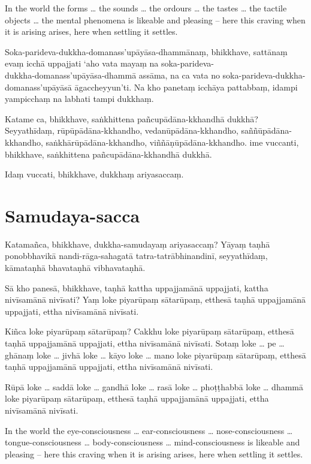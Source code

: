 In the world the forms \ldots{} the sounds \ldots{} the ordours \ldots{} the
tastes \ldots{} the tactile objects \ldots{} the mental phenomena is likeable
and pleasing -- here this craving when it is arising arises, here when settling
it settles.

\paliPage

Soka-parideva-dukkha-domanass'upāyāsa-dhammānaṃ, bhikkhave, sattānaṃ evaṃ icchā
uppajjati ‘aho vata mayaṃ na soka-parideva-\\
dukkha-domanass'upāyāsa-dhammā assāma, na ca vata no
soka-parideva-dukkha-domanass'upāyāsā āgaccheyyun’ti. Na kho panetaṃ icchāya
pattabbaṃ, idampi yampicchaṃ na labhati tampi dukkhaṃ.

Katame ca, bhikkhave, saṅkhittena pañcupādāna-kkhandhā dukkhā? Seyyathīdaṃ,
rūpūpādāna-kkhandho, vedanūpādāna-kkhandho, saññūpādāna-kkhandho,
saṅkhārūpādāna-kkhandho, viññāṇūpādāna-kkhandho. ime vuccanti, bhikkhave,
saṅkhittena pañcupādāna-kkhandhā dukkhā.

Idaṃ vuccati, bhikkhave, dukkhaṃ ariyasaccaṃ.

\section*{Samudaya-sacca}

Katamañca, bhikkhave, dukkha-samudayaṃ ariyasaccaṃ? Yāyaṃ taṇhā ponobbhavikā
nandi-rāga-sahagatā tatra-tatrābhinandinī, seyyathīdaṃ, kāmataṇhā bhavataṇhā
vibhavataṇhā.

Sā kho panesā, bhikkhave, taṇhā kattha uppajjamānā uppajjati, kattha nivīsamānā
nivīsati? Yaṃ loke piyarūpaṃ sātarūpaṃ, etthesā taṇhā uppajjamānā uppajjati,
ettha nivīsamānā nivīsati.

Kiñca loke piyarūpaṃ sātarūpaṃ? Cakkhu loke piyarūpaṃ sātarūpaṃ, etthesā taṇhā
uppajjamānā uppajjati, ettha nivīsamānā nivīsati. Sotaṃ loke \ldots{} pe
\ldots{} ghānaṃ loke \ldots{} jivhā loke \ldots{} kāyo loke \ldots{} mano loke
piyarūpaṃ sātarūpaṃ, etthesā taṇhā uppajjamānā uppajjati, ettha nivīsamānā
nivīsati.

Rūpā loke \ldots{} saddā loke \ldots{} gandhā loke \ldots{} rasā loke \ldots{}
phoṭṭhabbā loke \ldots{} dhammā loke piyarūpaṃ sātarūpaṃ, etthesā taṇhā
uppajjamānā uppajjati, ettha nivīsamānā nivīsati.

\englishPage

In the world the eye-consciousness \ldots{} ear-consciousness \ldots{} nose-consciousness
 \ldots{} tongue-consciousness \ldots{} body-consciousness \ldots{} mind-consciousness is likeable
and pleasing -- here this craving when it is arising arises, here when settling
it settles.

